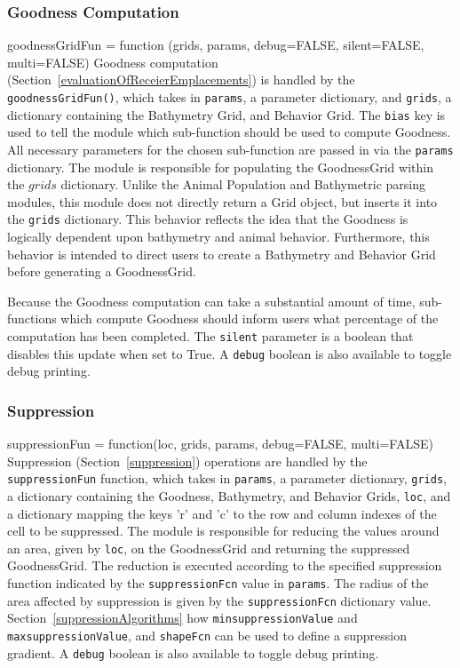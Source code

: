 \subsubsection{Goodness Computation}
goodnessGridFun = function (grids, params, debug=FALSE, silent=FALSE, multi=FALSE) 
Goodness computation (Section~\ref{evaluationOfReceierEmplacements}) is handled by the \texttt{goodnessGridFun()}, which takes in \texttt{params}, a parameter dictionary, and \texttt{grids}, a dictionary containing the Bathymetry Grid, and Behavior Grid.  The \texttt{bias} key is used to tell the module which sub-function should be used to compute Goodness.  All necessary parameters for the chosen sub-function are passed in via the \texttt{params} dictionary.  The module is responsible for populating the GoodnessGrid within the $grids$ dictionary.  Unlike the Animal Population and Bathymetric parsing modules, this module does not directly return a Grid object, but inserts it into the \texttt{grids} dictionary.  This behavior reflects the idea that the Goodness is logically dependent upon bathymetry and animal behavior.  Furthermore, this behavior is intended to direct users to create a Bathymetry and Behavior Grid before generating a GoodnessGrid.

Because the Goodness computation can take a substantial amount of time, sub-functions which compute Goodness should inform users what percentage of the computation has been completed.  The \texttt{silent} parameter is a boolean that disables this update when set to True.  A \texttt{debug} boolean is also available to toggle debug printing.

\subsubsection{Suppression}
suppressionFun = function(loc, grids, params, debug=FALSE, multi=FALSE)
Suppression (Section~\ref{suppression}) operations are handled by the \texttt{suppressionFun} function, which takes in \texttt{params}, a parameter dictionary, \texttt{grids}, a dictionary containing the Goodness, Bathymetry, and Behavior Grids, \texttt{loc}, and a dictionary mapping the keys 'r' and 'c' to the row and column indexes of the cell to be suppressed.  The module is responsible for reducing the values around an area, given by \texttt{loc}, on the GoodnessGrid and returning the suppressed GoodnessGrid.  The reduction is executed according to the specified suppression function indicated by the \texttt{suppressionFcn} value in \texttt{params}.  The radius of the area affected by suppression is given by the \texttt{suppressionFcn} dictionary value.  Section~\ref{suppressionAlgorithms} how \texttt{minsuppressionValue} and \texttt{maxsuppressionValue}, and \texttt{shapeFcn} can be used to define a suppression gradient.
 A \texttt{debug} boolean is also available to toggle debug printing.




